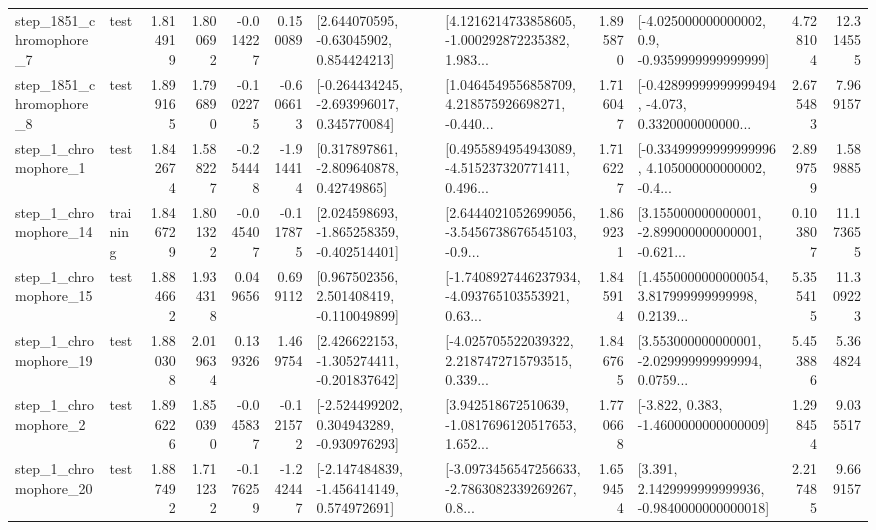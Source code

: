 \begin{tabular}{llrrrrllrlrr}
  step\_1851\_chromophore\_7 &      test &      1.814919 &    1.800692 &     -0.014227 &  0.150089 &     [2.644070595, -0.63045902, 0.854424213] &  [4.1216214733858605, -1.000292872235382, 1.983... &       1.895870 &     [-4.025000000000002, 0.9, -0.9359999999999999] &            4.728104 &         12.314555 \\
  step\_1851\_chromophore\_8 &      test &      1.899165 &    1.796890 &     -0.102275 & -0.606613 &   [-0.264434245, -2.693996017, 0.345770084] &  [1.0464549556858709, 4.218575926698271, -0.440... &       1.716047 &  [-0.42899999999999494, -4.073, 0.3320000000000... &            2.675483 &          7.969157 \\
     step\_1\_chromophore\_1 &      test &      1.842674 &    1.588227 &     -0.254448 & -1.914414 &     [0.317897861, -2.809640878, 0.42749865] &  [0.4955894954943089, -4.515237320771411, 0.496... &       1.716227 &  [-0.33499999999999996, 4.105000000000002, -0.4... &            2.899759 &          1.589885 \\
    step\_1\_chromophore\_14 &  training &      1.846729 &    1.801322 &     -0.045407 & -0.117875 &   [2.024598693, -1.865258359, -0.402514401] &  [2.6444021052699056, -3.5456738676545103, -0.9... &       1.869231 &  [3.155000000000001, -2.899000000000001, -0.621... &            0.103807 &         11.173655 \\
    step\_1\_chromophore\_15 &      test &      1.884662 &    1.934318 &      0.049656 &  0.699112 &    [0.967502356, 2.501408419, -0.110049899] &  [-1.7408927446237934, -4.093765103553921, 0.63... &       1.845914 &  [1.4550000000000054, 3.817999999999998, 0.2139... &            5.355415 &         11.309223 \\
    step\_1\_chromophore\_19 &      test &      1.880308 &    2.019634 &      0.139326 &  1.469754 &   [2.426622153, -1.305274411, -0.201837642] &  [-4.025705522039322, 2.2187472715793515, 0.339... &       1.846765 &  [3.553000000000001, -2.029999999999994, 0.0759... &            5.453886 &          5.364824 \\
     step\_1\_chromophore\_2 &      test &      1.896226 &    1.850390 &     -0.045837 & -0.121572 &   [-2.524499202, 0.304943289, -0.930976293] &  [3.942518672510639, -1.0817696120517653, 1.652... &       1.770668 &               [-3.822, 0.383, -1.4600000000000009] &            1.298454 &          9.035517 \\
    step\_1\_chromophore\_20 &      test &      1.887492 &    1.711232 &     -0.176259 & -1.242447 &   [-2.147484839, -1.456414149, 0.574972691] &  [-3.0973456547256633, -2.7863082339269267, 0.8... &       1.659454 &   [3.391, 2.1429999999999936, -0.9840000000000018] &            2.217485 &          9.669157 \\

\end{tabular}
